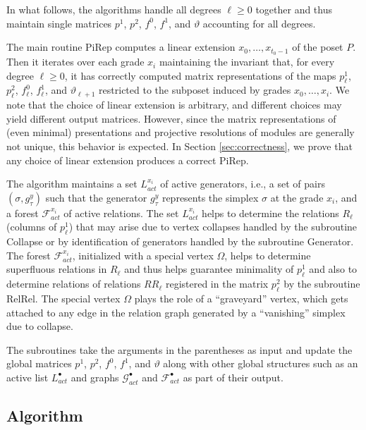 \documentclass[english,a4paper,nolineno,cleveref]{socg-lipics-v2021}
\newcommand{\F}{\mathcal F}
\begin{document}
In what follows, the algorithms handle all degrees $\ell\geq 0$ together and thus maintain single matrices $p^1$, $p^2$, $f^0$, $f^1$, and $\vartheta$ accounting for all degrees. 
 

The main routine {\sc PiRep} computes a linear extension $x_0,\ldots, x_{t_0\minus 1}$
of the poset $P$. Then it iterates over each grade $x_i$ maintaining the invariant
that, for every degree $\ell\geq 0$, it has correctly computed matrix representations of the maps $p^1_\ell$, $p^2_\ell$, $f_\ell^0$, $f_\ell^1$, and $\vartheta_{\ell+1}$ restricted to the subposet induced by grades $x_0,\ldots, x_i$. We note that the choice of linear extension is arbitrary, and different choices may yield different output matrices. However, since the matrix representations of (even minimal) presentations and projective resolutions of modules are generally not unique, this behavior is expected. In Section \ref{sec:correctness}, we prove that any choice of linear extension produces a correct PiRep.

The algorithm maintains a set $L_{act}^{x_i}$ of active generators, i.e., a set of pairs $(\sigma,g_\tau^{y})$ such that the generator $g_\tau^y$ represents the simplex $\sigma$ at the grade $x_i$, and a forest $\F_{act}^{x_i}$
of active relations. The set $L_{act}^{x_i}$ helps to determine
the relations $R_\ell$ (columns of $p_\ell^1$) that may arise due to
vertex collapses handled by the subroutine {\sc Collapse} or by
identification of generators handled by the subroutine {\sc Generator}.
The forest $\F_{act}^{x_i}$, initialized with a special vertex $\Omega$, helps to determine superfluous relations
in $R_\ell$ and thus helps guarantee minimality of $p_\ell^1$ and also
to determine relations of relations $RR_\ell$ registered in the matrix $p_\ell^2$ by the subroutine {\sc RelRel}. The special vertex $\Omega$ 
plays the role of a ``graveyard'' vertex, which gets attached to any edge in the
relation graph generated by a ``vanishing'' simplex due to collapse.

The subroutines take the arguments in the parentheses as input and update the global matrices $p^1$, $p^2$,  $f^0$, $f^1$, and $\vartheta$ along with other global structures such as an active list $L_{act}^\bullet$ and
graphs $\mathcal{G}_{act}^\bullet$ and $\mathcal{F}_{act}^\bullet$ as part of their output.

\subsection{Algorithm}
\end{document}
